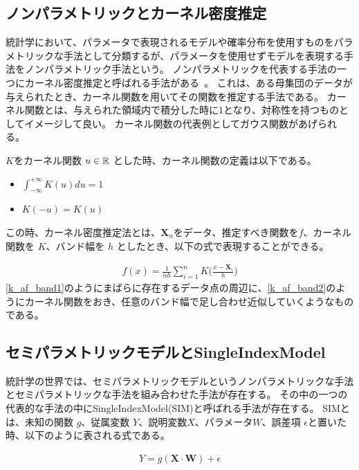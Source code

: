 \subsection{ノンパラメトリックとカーネル密度推定}
統計学において、パラメータで表現されるモデルや確率分布を使用すものをパラメトリックな手法として分類するが、パラメータを使用せずモデルを表現する手法をノンパラメトリック手法という。
ノンパラメトリックを代表する手法の一つにカーネル密度推定と呼ばれる手法がある~\cite{kernel_density}。
これは、ある母集団のデータが与えられたとき、カーネル関数を用いてその関数を推定する手法である。
カーネル関数とは、与えられた領域内で積分した時に1となり、対称性を持つものとしてイメージして良い。
カーネル関数の代表例としてガウス関数があげられる。

$ K $をカーネル関数 $ u \in \mathbb{R} $ とした時、カーネル関数の定義は以下である。

\begin{itemize}
  \item $ \int^{+ \infty}_{- \infty} K(u)du = 1 $
  \item $ K(-u) = K(u) $
\end{itemize}


この時、カーネル密度推定法とは、$ \mathbf{X}_n $をデータ、推定すべき関数を$ f $、カーネル関数を $ K $、バンド幅を $ h $ としたとき、以下の式で表現することができる。


\begin{eqnarray}
f(x) = \frac{1}{nh} \sum^n_{i=1}K \bigl( \frac{x - \mathbf{X}_i}{h}\bigr)
\label{eq:k-af}
\end{eqnarray}
\ref{k_af_band1}のようにまばらに存在するデータ点の周辺に、\ref{k_af_band2}のようにカーネル関数をおき、任意のバンド幅で足し合わせ近似していくようなものである。






\subsection{セミパラメトリックモデルとSingleIndexModel}

統計学の世界では、セミパラメトリックモデルというノンパラメトリックな手法とセミパラメトリックな手法を組み合わせた手法が存在する。
その中の一つの代表的な手法の中にSingleIndexModel(SIM)と呼ばれる手法が存在する。
SIMとは、未知の関数 $ g $、従属変数 $ Y $、説明変数$ X $、パラメータ$ W $、誤差項 $ \epsilon $と置いた時、以下のように表される式である。

\begin{eqnarray}
Y = g(\mathbf{X} \cdot  \mathbf{W}) + \epsilon
\label{eq:k-af}
\end{eqnarray}

